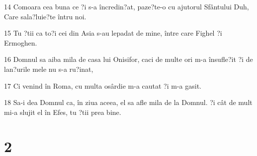\par 14 Comoara cea buna ce ?i s-a încredin?at, paze?te-o cu ajutorul Sfântului Duh, Care sala?luie?te întru noi.
\par 15 Tu ?tii ca to?i cei din Asia s-au lepadat de mine, între care Fighel ?i Ermoghen.
\par 16 Domnul sa aiba mila de casa lui Onisifor, caci de multe ori m-a însufle?it ?i de lan?urile mele nu s-a ru?inat,
\par 17 Ci venind în Roma, cu multa osârdie m-a cautat ?i m-a gasit.
\par 18 Sa-i dea Domnul ca, în ziua aceea, el sa afle mila de la Domnul. ?i cât de mult mi-a slujit el în Efes, tu ?tii prea bine.

\chapter{2}

